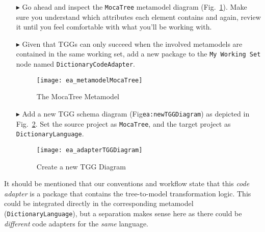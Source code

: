 \begin{itemize}

\item[$\blacktriangleright$] Go ahead and inspect the \texttt{MocaTree} metamodel diagram (Fig.~\ref{ea:mocaTree}). Make sure you understand which attributes
each element contains and again, review it until you feel comfortable with what you'll be working with.

\item[$\blacktriangleright$] Given that TGGs can only succeed when the involved metamodels are contained in the same working set, add a new package to the
\texttt{My Working Set} node named \texttt{Dict\-ion\-ary\-Code\-Adap\-ter}.

\newpage

\begin{figure}[htpb]
\begin{center}
  \texttt{[image: ea\_metamodelMocaTree]}
  \caption{The MocaTree Metamodel}
  \label{ea:mocaTree}
\end{center}
\end{figure}

\vspace{1cm}

\item[$\blacktriangleright$] Add a new TGG schema diagram (Fig\texttt{ea:newTGGDiagram}) as depicted in Fig.~\ref{ea:newTGGDiagram}. Set the source project as
\texttt{MocaTree}, and the target project as \texttt{Dict\-ion\-ary\-Lang\-uage}.

\vspace{1cm}

\begin{figure}[htpb]
\begin{center}
  \texttt{[image: ea\_adapterTGGDiagram]}
  \caption{Create a new TGG Diagram}
  \label{ea:newTGGDiagram}
\end{center}
\end{figure}

\end{itemize}

\clearpage

It should be mentioned that our conventions and workflow state that this \emph{code adapter} is a package that contains the tree-to-model transformation logic.
This could be integrated directly in the corresponding metamodel (\texttt{Dic\-tion\-ary\-Language}), but a separation makes sense here as there could be
\emph{different} code adapters for the \emph{same} language.

